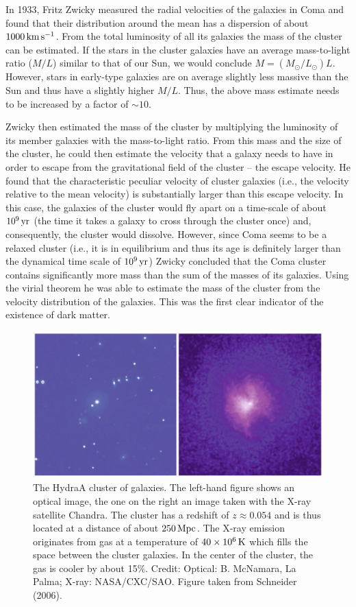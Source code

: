 \documentclass[a4paper,10pt]{article}
\begin{document}
{\noindent}In 1933, Fritz Zwicky measured the radial velocities of the galaxies in Coma and found that their distribution around the mean has a dispersion of about $1000\,{\rm km\,s^{-1}}$. From the total luminosity of all its galaxies the mass of the cluster can be estimated. If the stars in the cluster galaxies have an average mass-to-light ratio ($M/L$) similar to that of our Sun, we would conclude $M=(M_\odot/L_\odot)L$. However, stars in early-type galaxies are on average slightly less massive than the Sun and thus have a slightly higher $M/L$. Thus, the above mass estimate needs to be increased by a factor of $\sim10$.

{\noindent}Zwicky then estimated the mass of the cluster by multiplying the luminosity of its member galaxies with the mass-to-light ratio. From this mass and the size of the cluster, he could then estimate the velocity that a galaxy needs to have in order to escape from the gravitational field of the cluster -- the escape velocity. He found that the characteristic peculiar velocity of cluster galaxies (i.e., the velocity relative to the mean velocity) is substantially larger than this escape velocity. In this case, the galaxies of the cluster would fly apart on a time-scale of about $10^9\,{\rm yr}$ (the time it takes a galaxy to cross through the cluster once) and, consequently, the cluster would dissolve. However, since Coma seems to be a relaxed cluster (i.e., it is in equilibrium and thus its age is definitely larger than the dynamical time scale of $10^9\,{\rm yr}$) Zwicky concluded that the Coma cluster contains significantly more mass than the sum of the masses of its galaxies. Using the virial theorem he was able to estimate the mass of the cluster from the velocity distribution of the galaxies. This was the first clear indicator of the existence of dark matter.

\begin{figure}[h]
    \centering
    \includegraphics[width=14cm]{figures/HydraA.png}
    \caption{\footnotesize{The HydraA cluster of galaxies. The left-hand figure shows an optical image, the one on the right an image taken with the X-ray satellite Chandra. The cluster has a redshift of $z\approx0.054$ and is thus located at a distance of about $250\,{\rm Mpc}$. The X-ray emission originates from gas at a temperature of $40\times10^6\,{\rm K}$ which fills the space between the cluster galaxies. In the center of the cluster, the gas is cooler by about 15\%. Credit: Optical: B. McNamara, La Palma; X-ray: NASA/CXC/SAO. Figure taken from Schneider (2006).}}
    \label{fig:hydraa}
\end{figure}
\end{document}
